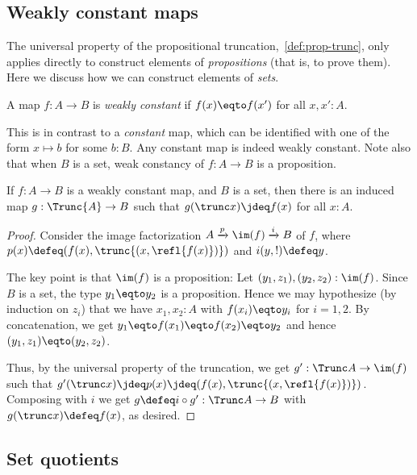 \subsection{Weakly constant maps}

The universal property of the propositional truncation,~\cref{def:prop-trunc},
only applies directly to construct elements of \emph{propositions} (that is, to prove them).
Here we discuss how we can construct elements of \emph{sets}.

\begin{definition}
  A map $f: A \to B$ is \emph{weakly constant} if $f(x) \eqto f(x')$ for all $x,x':A$.
\end{definition}
This is in contrast to a \emph{constant} map,
which can be identified with one of the form $x \mapsto b$ for some $b:B$.
Any constant map is indeed weakly constant.
Note also that when $B$ is a set,
weak constancy of $f : A \to B$ is a proposition.

\begin{theorem}\label{thm:wconstant-elim}
  If $f : A \to B$ is a weakly constant map, and $B$ is a set, then
  there is an induced map $g : \Trunc{A} \to B$ such that
  $g(\trunc x)\jdeq f(x)$ for all $x:A$.
\end{theorem}
\begin{proof}
  Consider the image factorization
  $A \xrightarrow{p}{} \im(f) \xrightarrow{i}{} B$ of $f$,
  where $p(x) \defeq (f(x),\trunc{(x,\refl{f(x)})})$
  and $i(y,!) \defeq y$.

  The key point is that $\im(f)$ is a proposition: Let
  $(y_1,z_1),(y_2,z_2):\im(f)$. Since $B$ is a set, the type $y_1 \eqto y_2$ is a proposition. Hence we may hypothesize (by induction on $z_i$)
  that we have $x_1,x_2:A$ with
  $f(x_i) \eqto y_i$ for $i=1,2$. By concatenation, we get
  $y_1 \eqto f(x_1) \eqto f(x_2) \eqto y_2$ and hence $(y_1,z_1) \eqto (y_2,z_2)$.

  Thus, by the universal property of the truncation,
  we get $g' : \Trunc A \to \im(f)$ such
  that $g'(\trunc x) \jdeq p(x) \jdeq (f(x),\trunc{(x,\refl{f(x)})})$.
  Composing with $i$ we get $g\defeq i\circ g' : \Trunc A \to B$
  with $g(\trunc x) \defeq f(x)$, as desired.
\end{proof}

\subsection{Set quotients}

